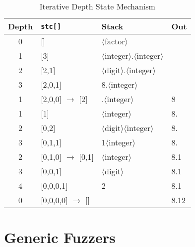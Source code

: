 \documentclass[8pt, twoside]{extarticle}
\begin{document}
\begin{table}[hbt!]
	\centering\small

	\begin{tabular}{clll}
		Depth & \verb|stc[]|                     & Stack                                                & Out  \\
		\hline %
		0     & []                              & $\langle$factor$\rangle$                             &      \\
		1     & [3]                            & $\langle$integer$\rangle$.$\langle$integer$\rangle$  &      \\
		2     & [2,1]                          & $\langle$digit$\rangle$.$\langle$integer$\rangle$    &      \\
		3     & [2,0,1]                        & 8.$\langle$integer$\rangle$                          &      \\
		1     & [2,0,0] $\rightarrow$ [2]    & .$\langle$integer$\rangle$                           & 8    \\
		1     & [1]                            & $\langle$integer$\rangle$                            & 8.   \\
		2     & [0,2]                          & $\langle$digit$\rangle$$\langle$integer$\rangle$     & 8.   \\
		3     & [0,1,1]                        & 1$\langle$integer$\rangle$                           & 8.   \\
		2     & [0,1,0] $\rightarrow$ [0,1]  & $\langle$integer$\rangle$                            & 8.1  \\
		3     & [0,0,1]                        & $\langle$digit$\rangle$                              & 8.1  \\
		4     & [0,0,0,1]                      & 2                                                    & 8.1  \\
		0     & [0,0,0,0] $\rightarrow$ []    &                                                      & 8.12
	\end{tabular}

	\caption{Iterative Depth State Mechanism}
	\label{tbl:iterative_depth_state}
\end{table}

\section{Generic Fuzzers} \label{sec:genfuzz}
\end{document}
